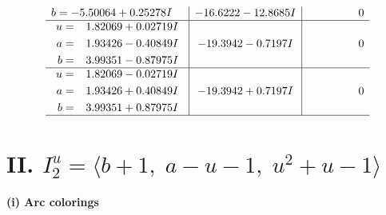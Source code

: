 \documentclass[1p]{elsarticle_modified}
\theoremstyle{definition}
\begin{document}
$$\begin{array}{c|c|c}
\begin{aligned}
b &= -5.50064 + 0.25278 I\end{aligned}
 & -16.6222 - 12.8685 I & \phantom{-0.000000 } 0 \\ \hline\begin{aligned}
u &= \phantom{-}1.82069 + 0.02719 I \\
a &= \phantom{-}1.93426 - 0.40849 I \\
b &= \phantom{-}3.99351 - 0.87975 I\end{aligned}
 & -19.3942 - 0.7197 I & \phantom{-0.000000 } 0 \\ \hline\begin{aligned}
u &= \phantom{-}1.82069 - 0.02719 I \\
a &= \phantom{-}1.93426 + 0.40849 I \\
b &= \phantom{-}3.99351 + 0.87975 I\end{aligned}
 & -19.3942 + 0.7197 I & \phantom{-0.000000 } 0\\
 \hline 
 \end{array}$$\newpage\newpage\renewcommand{\arraystretch}{1}
\centering \section*{II. $I^u_{2}= \langle b+1,\;a- u-1,\;u^2+u-1 \rangle$}
\flushleft \textbf{(i) Arc colorings}\\
\end{document}
